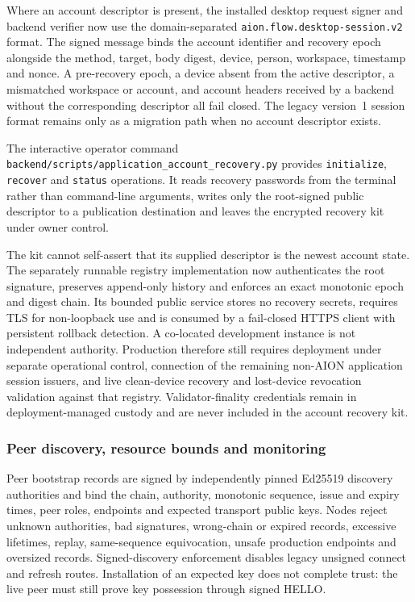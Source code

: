 Where an account descriptor is present, the installed desktop request signer
and backend verifier now use the domain-separated
\texttt{aion.flow.desktop-session.v2} format.  The signed message binds the
account identifier and recovery epoch alongside the method, target, body
digest, device, person, workspace, timestamp and nonce.  A pre-recovery epoch,
a device absent from the active descriptor, a mismatched workspace or account,
and account headers received by a backend without the corresponding descriptor
all fail closed.  The legacy version~1 session format remains only as a
migration path when no account descriptor exists.

The interactive operator command
\texttt{backend/scripts/application\_account\_recovery.py} provides
\texttt{initialize}, \texttt{recover} and \texttt{status} operations.  It reads
recovery passwords from the terminal rather than command-line arguments,
writes only the root-signed public descriptor to a publication destination and
leaves the encrypted recovery kit under owner control.

The kit cannot self-assert that its supplied descriptor is the newest account
state.  The separately runnable registry implementation now authenticates the
root signature, preserves append-only history and enforces an exact monotonic
epoch and digest chain.  Its bounded public service stores no recovery secrets,
requires TLS for non-loopback use and is consumed by a fail-closed HTTPS client
with persistent rollback detection.  A co-located development instance is not
independent authority.  Production therefore still requires deployment under
separate operational control, connection of the remaining non-AION application
session issuers, and live clean-device recovery and lost-device revocation
validation against that registry.  Validator-finality credentials remain in
deployment-managed custody and are never included in the account recovery kit.

\subsubsection{Peer discovery, resource bounds and monitoring}

Peer bootstrap records are signed by independently pinned Ed25519 discovery
authorities and bind the chain, authority, monotonic sequence, issue and expiry
times, peer roles, endpoints and expected transport public keys. Nodes reject
unknown authorities, bad signatures, wrong-chain or expired records, excessive
lifetimes, replay, same-sequence equivocation, unsafe production endpoints and
oversized records. Signed-discovery enforcement disables legacy unsigned
connect and refresh routes. Installation of an expected key does not complete
trust: the live peer must still prove key possession through signed HELLO.

